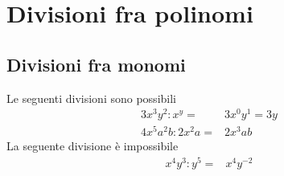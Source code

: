 \chapter{Divisioni fra polinomi}
\label{cha:Divisionipolinomi}

\section{Divisioni fra monomi}
\begin{esempiot}{}{}
Le seguenti divisioni sono possibili
\begin{align*}
3x^3y^2:x^y=&3x^0y^1=3y\\
4x^5a^2b:2x^2a=&2x^3ab
\end{align*}
La seguente divisione è impossibile
\begin{align*}
x^4y^3:y^5=&x^4y^{-2}
\end{align*}
\end{esempiot}
